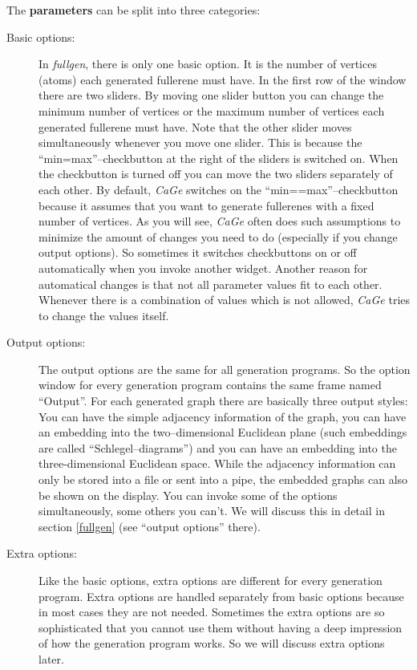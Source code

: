 \documentclass[a4paper]{article}
\def\CaGe{\textit{CaGe}}
\begin{document}
\noindent The \textbf{parameters} can be split into three categories:
\begin{description}
\item[Basic options:] In \textit{fullgen}, there is only one basic option.
It is the number of vertices (atoms) each generated fullerene must have. In 
the first
row of the window there are two sliders. By moving one slider button you can
change the minimum number of vertices or the maximum number of vertices each
generated fullerene must have. Note that the other slider moves simultaneously
whenever you move one slider. This is because the ``min=max''--checkbutton at
the right of the sliders is switched on. When the checkbutton is turned off
you can move the two sliders separately of each other. By default, 
\CaGe{} switches on
the ``min==max''--checkbutton because it assumes that you 
want to generate fullerenes with a fixed number of vertices. 
As you will see, \CaGe{} often does such assumptions to minimize the amount
of changes you need to do (especially if you change output options). So 
sometimes it switches checkbuttons on or off
automatically when you invoke another widget. Another reason for automatical
changes is that not all parameter values fit to each other. Whenever there is
a combination of values which is not allowed, \CaGe{} tries to change the
values itself.
\item[Output options:] The output options are the same for all generation
programs. So the option window for every generation program contains the same
frame named ``Output''. For each generated graph there are basically three
output styles: You can have the simple adjacency information of the graph, you
can have an embedding into the two--dimensional Euclidean plane (such 
embeddings are called ``Schlegel--diagrams'') and you can have an embedding
into the three-dimensional Euclidean space. While the adjacency information
can only be stored into a file or sent into a pipe, the embedded graphs can 
also be shown on the display. You can invoke some of the options 
simultaneously, some others you can't. We will discuss this in detail in
section \ref{fullgen} (see ``output options'' there).
\item[Extra options:] Like the basic options, extra options are different
for every generation program. Extra options are handled separately from 
basic options because in most cases they are not needed. Sometimes the extra
options are so sophisticated that you cannot use them without having a deep 
impression of how the generation program works. So we will discuss extra
options later.
\end{description}
\end{document}

